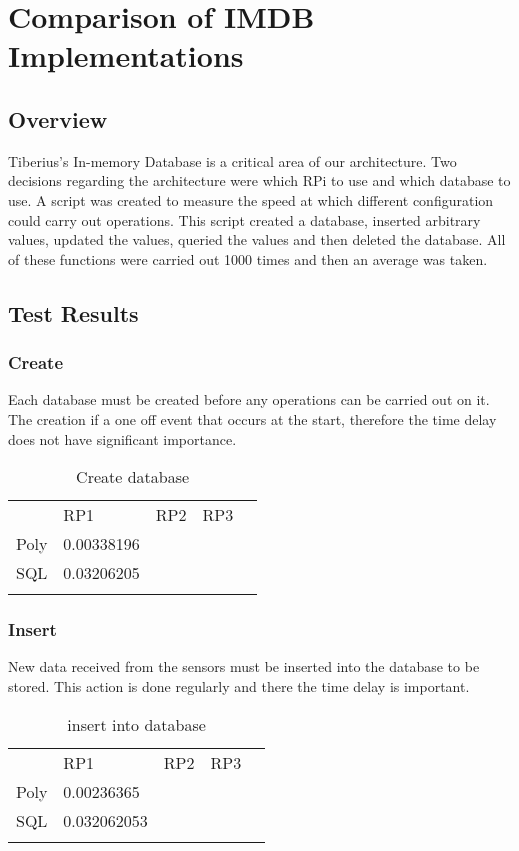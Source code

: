 \chapter{Comparison of IMDB Implementations}
\pagestyle{cameron}
\section{Overview}
Tiberius's In-memory Database is a critical area of our architecture. Two decisions regarding the architecture were which RPi to use and which database to use. A script was created to measure the speed at which different configuration could carry out operations. This script created a database, inserted arbitrary values, updated the values, queried the  values and then deleted the database. All of these functions were carried out 1000 times and then an average was taken.

\section{Test Results}
\subsection{Create}
Each database must be created before any operations can be carried out on it. The creation if a one off event that occurs at the start, therefore the time delay does not have significant importance.  

\begin{table}[!htb]
\centering
\caption{Create database }
\label{Create}
\begin{tabular}{lllll}
     & RP1         & RP2 & RP3 &  \\
Poly & 0.00338196 &     &     &  \\
SQL  & 0.03206205 &     &     &  \\
     &             &     &     & 
\end{tabular}
\end{table}

\subsection{Insert}
New data received from the sensors must be inserted into the database to be stored. This action is done regularly and there the time delay is important. 
\begin{table}[!htb]
\centering
\caption{insert into database}
\label{insert}
\begin{tabular}{lllll}
     & RP1         & RP2 & RP3 &  \\
Poly & 0.00236365 &     &     &  \\
SQL  & 0.032062053 &     &     &  \\
     &             &     &     & 
\end{tabular}
\end{table}

